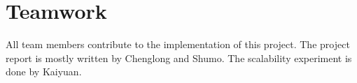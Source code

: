 \section{Teamwork}

All team members contribute to the implementation of this project. The project report is mostly written by Chenglong and Shumo. 
The scalability experiment is done by Kaiyuan.

